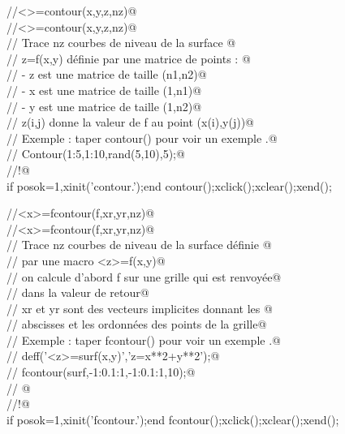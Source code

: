 
\verb@//<>=contour(x,y,z,nz)@ \\
\verb@//<>=contour(x,y,z,nz)@ \\
\verb@// Trace nz courbes de niveau de la surface @ \\
\verb@// z=f(x,y) d\'efinie par une matrice de  points : @ \\
\verb@// - z est une matrice de taille (n1,n2)@ \\
\verb@// - x est une matrice de taille (1,n1)@ \\
\verb@// - y est une matrice de taille (1,n2)@ \\
\verb@// z(i,j) donne la valeur de f au point (x(i),y(j))@ \\
\verb@// Exemple : taper contour() pour voir un exemple .@ \\
\verb@//         Contour(1:5,1:10,rand(5,10),5);@ \\
\verb@//!@ \\
if posok=1,xinit('contour.');end
contour();xclick();xclear();xend();


\verb@//<x>=fcontour(f,xr,yr,nz)@ \\
\verb@//<x>=fcontour(f,xr,yr,nz)@ \\
\verb@// Trace nz courbes de niveau de la surface d\'efinie @ \\
\verb@// par une macro <z>=f(x,y)@ \\
\verb@// on calcule d'abord f sur une grille qui est renvoy\'ee@ \\
\verb@// dans la valeur de retour@ \\
\verb@// xr et yr sont des vecteurs implicites donnant les @ \\
\verb@// abscisses et les ordonn\'ees des points de la grille@ \\
\verb@// Exemple : taper fcontour() pour voir un exemple .@ \\
\verb@// deff('<z>=surf(x,y)','z=x**2+y**2');@ \\
\verb@// fcontour(surf,-1:0.1:1,-1:0.1:1,10);@ \\
\verb@// @ \\
\verb@//!@ \\
if posok=1,xinit('fcontour.');end
fcontour();xclick();xclear();xend();

